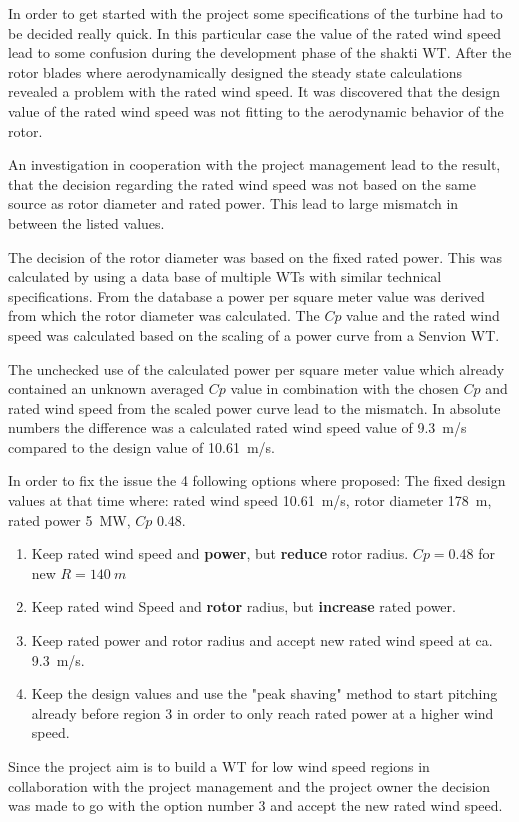 In order to get started with the project some specifications of the turbine had to be decided really quick.
In this particular case the value of the rated wind speed lead to some confusion during the development phase of the \gls{shakti} WT.
After the rotor blades where aerodynamically designed the steady state calculations revealed a problem with the rated wind speed.
It was discovered that the design value of the rated wind speed was not fitting to the aerodynamic behavior of the rotor.

An investigation in cooperation with the project management lead to the result, that the decision regarding the rated wind speed was not based on the same source as rotor diameter and rated power.
This lead to large mismatch in between the listed values.

The decision of the rotor diameter was based on the fixed rated power. 
This was calculated by using a data base of multiple WTs with similar technical specifications.
From the database a power per square meter value was derived from which the rotor diameter was calculated.
The $Cp$ value and the rated wind speed was calculated based on the scaling of a power curve from a Senvion WT.

The unchecked use of the calculated power per square meter value which already contained an unknown averaged $Cp$ value in combination with the chosen $Cp$ and rated wind speed from the scaled power curve lead to the mismatch. In absolute numbers the difference was a calculated rated wind speed value of \SI{9.3}{m/s} compared to the design value of \SI{10.61}{m/s}.

In order to fix the issue the 4 following options where proposed:
The fixed design values at that time where: rated wind speed \SI{10.61}{m/s}, rotor diameter \SI{178}{m}, rated power \SI{5}{MW}, $Cp$ \SI{0.48}{}.
\begin{enumerate}
	\item Keep rated wind speed and \textbf{power}, but \textbf{reduce} rotor radius. $Cp = 0.48$ for new $R = \SI{140}{m}$
	\item Keep rated wind Speed and \textbf{rotor} radius, but \textbf{increase} rated power.
	\item Keep rated power and rotor radius and accept new rated wind speed at ca. \SI{9.3}{m/s}.
	\item Keep the design values and use the "peak shaving" method to start pitching already before region 3 in order to only reach rated power at a higher wind speed.
\end{enumerate}

Since the project aim is to build a WT for low wind speed regions in collaboration with the project management and the project owner the decision was made to go with the option number 3 and accept the new rated wind speed. 
